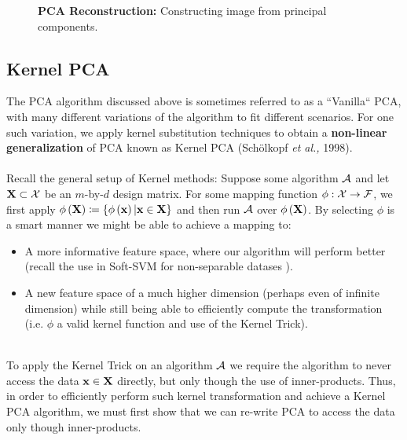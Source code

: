 \begin{figure}[h!]
	\centering
	\caption{\textbf{PCA Reconstruction:} Constructing image from principal components. \GitChapterSevelExamplesPCA}
	\label{anim:pca}
\end{figure}



\subsection{Kernel PCA}\label{kernel_pca}
The PCA algorithm discussed above is sometimes referred to as a ``Vanilla`` PCA, with many different variations of the algorithm to fit different scenarios. For one such variation, we apply kernel substitution techniques to obtain a \textbf{non-linear generalization} of PCA known as Kernel PCA (Sch\"olkopf \textit{et al.,} 1998). 
\\~\\Recall the general setup of Kernel methods: Suppose some algorithm $\mathcal{A}$ and let $\mathbf{X}\subset\mathcal{X}$ be an $m$-by-$d$ design matrix. For some mapping function $\phi:\mathcal{X}\rightarrow\mathcal{F}$, we first apply $\phi\left(\mathbf{X}\right)\coloneqq\left\{\phi\left(\mathbf{x}\right) | \mathbf{x}\in\mathbf{X}\right\}$ and then run $\mathcal{A}$ over $\phi\left(\mathbf{X}\right)$. By selecting $\phi$ is a smart manner we might be able to achieve a mapping to:
~\\\begin{itemize}
	\item A more informative feature space, where our algorithm will perform better (recall the use in Soft-SVM for non-separable datases ).\\
	\item A new feature space of a much higher dimension (perhaps even of infinite dimension) while still being able to efficiently compute the transformation (i.e. $\phi$ a valid kernel function and use of the Kernel Trick).
\end{itemize}

~\\To apply the Kernel Trick on an algorithm $\mathcal{A}$ we require the algorithm to never access the data $\mathbf{x}\in\mathbf{X}$ directly, but only though the use of inner-products. Thus, in order to efficiently perform such kernel transformation and achieve a Kernel PCA algorithm, we must first show that we can re-write PCA to access the data only though inner-products.

